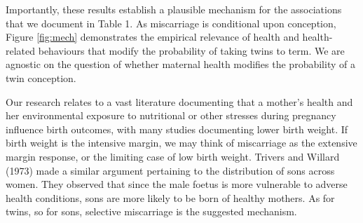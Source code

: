 \documentclass{nature}
\begin{document}
\begin{linenumbers}
Importantly, these results establish a plausible mechanism for the associations that we document in Table 1. %
As miscarriage is conditional upon conception, Figure \ref{fig:mech} demonstrates the empirical relevance of health and health-related behaviours that modify the probability of taking twins to term. %
We are agnostic on the question of whether maternal health modifies the probability of a twin conception.  


Our research relates to a vast literature documenting that a mother's health and her environmental exposure to nutritional or other stresses during pregnancy influence birth outcomes, with many studies documenting lower birth weight\cite{CurrieMoretti2007,Bernsteinetal2005,SerranoDomeque2014}. If birth weight is the intensive margin, we may think of miscarriage as the extensive margin response, or the limiting case of low birth weight. %
Trivers and Willard (1973) made a similar argument pertaining to the distribution of sons across women. They observed that since the male foetus is more vulnerable to adverse health conditions, sons are more likely to be born of healthy mothers. As for twins, so for sons, selective miscarriage is the suggested mechanism.



\end{linenumbers}
\end{document}
